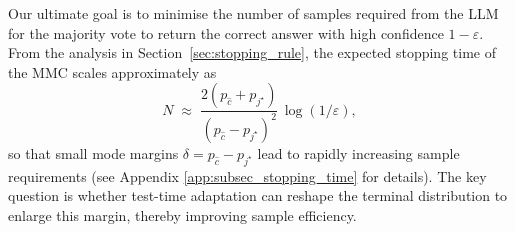 Our ultimate goal is to minimise the number of samples required from the LLM  for the majority vote to return the correct answer with high confidence $1-\varepsilon$. 
From the analysis in Section~\ref{sec:stopping_rule}, the
expected stopping time of the MMC scales approximately as
\begin{equation}\label{eq:expected_number_samples}
N \;\approx\;
\frac{2(p_{\hat c}+p_{j^\star})}{(p_{\hat c}-p_{j^\star})^{2}}
\,\log ({1}/{\varepsilon}),
\end{equation}
so that small mode margins \( \delta = p_{\hat c}-p_{j^\star} \) lead to rapidly increasing sample
requirements (see Appendix \ref{app:subsec_stopping_time} for details).  The key question is whether test-time adaptation can reshape the terminal distribution
to enlarge this margin, thereby improving sample efficiency.


